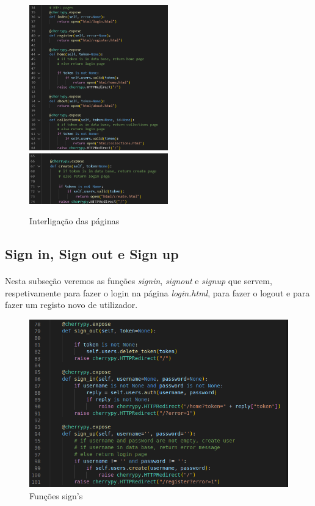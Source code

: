 \documentclass[a4paper, 11pt, oneside]{report}
\begin{document}
\begin{figure}[h]
\center
\includegraphics[width=170pt]{htmlPAGE1.png} \\
\includegraphics[width=170pt]{htmlPAGE2.png}
\caption{Interligação das páginas}
\end{figure}

\subsection{Sign in, Sign out e Sign up}

\paragraph{} Nesta subseção veremos as funções \textit{sign\textunderscore in}, \textit{sign\textunderscore out} e \textit{sign\textunderscore up} que servem, respetivamente para fazer o login na página \textit{login.html}, para fazer o logout e para fazer um registo novo de utilizador.

\begin{figure}[h]
\center
\includegraphics[width=320pt]{signsINOUTUP.png}
\caption{Funções sign's}
\end{figure}
\end{document}
